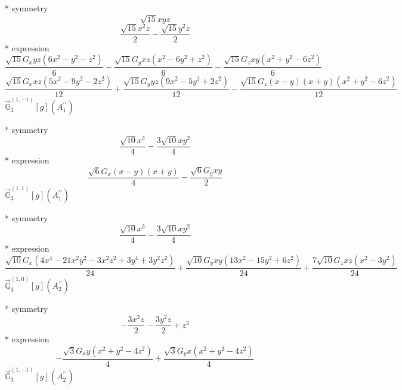 \documentclass[fleqn,8pt]{jsarticle}
\begin{document}
\noindent\quad ** symmetry
\begin{dmath*}
\sqrt{15} x y z
\end{dmath*}
\begin{dmath*}
\frac{\sqrt{15} x^{2} z}{2} - \frac{\sqrt{15} y^{2} z}{2}
\end{dmath*}
\noindent\quad ** expression
\begin{dmath*}
\frac{\sqrt{15} G_{x} y z \left(6 x^{2} - y^{2} - z^{2}\right)}{6} - \frac{\sqrt{15} G_{y} x z \left(x^{2} - 6 y^{2} + z^{2}\right)}{6} - \frac{\sqrt{15} G_{z} x y \left(x^{2} + y^{2} - 6 z^{2}\right)}{6}
\end{dmath*}
\begin{dmath*}
\frac{\sqrt{15} G_{x} x z \left(5 x^{2} - 9 y^{2} - 2 z^{2}\right)}{12} + \frac{\sqrt{15} G_{y} y z \left(9 x^{2} - 5 y^{2} + 2 z^{2}\right)}{12} - \frac{\sqrt{15} G_{z} \left(x - y\right) \left(x + y\right) \left(x^{2} + y^{2} - 6 z^{2}\right)}{12}
\end{dmath*}
\noindent\quad $\vec{\mathbb{G}}_{3}^{(1,-1)}[g](A_{1}^{\prime\prime})$

\noindent\quad ** symmetry
\begin{dmath*}
\frac{\sqrt{10} x^{3}}{4} - \frac{3 \sqrt{10} x y^{2}}{4}
\end{dmath*}
\noindent\quad ** expression
\begin{dmath*}
\frac{\sqrt{6} G_{x} \left(x - y\right) \left(x + y\right)}{4} - \frac{\sqrt{6} G_{y} x y}{2}
\end{dmath*}
\noindent\quad $\vec{\mathbb{G}}_{3}^{(1,1)}[g](A_{1}^{\prime\prime})$

\noindent\quad ** symmetry
\begin{dmath*}
\frac{\sqrt{10} x^{3}}{4} - \frac{3 \sqrt{10} x y^{2}}{4}
\end{dmath*}
\noindent\quad ** expression
\begin{dmath*}
\frac{\sqrt{10} G_{x} \left(4 x^{4} - 21 x^{2} y^{2} - 3 x^{2} z^{2} + 3 y^{4} + 3 y^{2} z^{2}\right)}{24} + \frac{\sqrt{10} G_{y} x y \left(13 x^{2} - 15 y^{2} + 6 z^{2}\right)}{24} + \frac{7 \sqrt{10} G_{z} x z \left(x^{2} - 3 y^{2}\right)}{24}
\end{dmath*}
\noindent\quad $\vec{\mathbb{Q}}_{3}^{(1,0)}[g](A_{2}^{\prime\prime})$

\noindent\quad ** symmetry
\begin{dmath*}
- \frac{3 x^{2} z}{2} - \frac{3 y^{2} z}{2} + z^{3}
\end{dmath*}
\noindent\quad ** expression
\begin{dmath*}
- \frac{\sqrt{3} G_{x} y \left(x^{2} + y^{2} - 4 z^{2}\right)}{4} + \frac{\sqrt{3} G_{y} x \left(x^{2} + y^{2} - 4 z^{2}\right)}{4}
\end{dmath*}
\noindent\quad $\vec{\mathbb{G}}_{3}^{(1,-1)}[g](A_{2}^{\prime\prime})$
\end{document}
